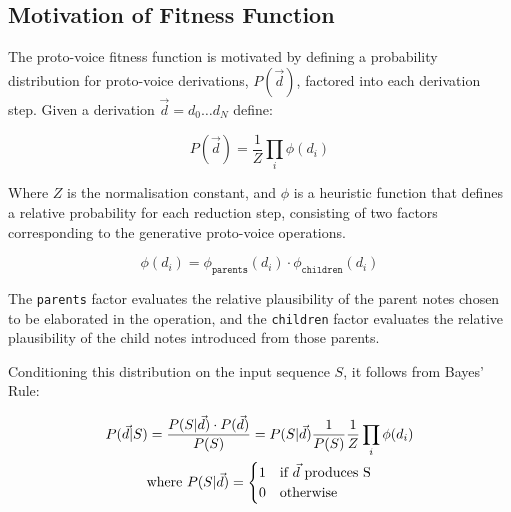 \documentclass[12pt,a4paper,twoside,openany]{report} \usepackage[pdfborder={0 0 0}]{hyperref}    %
\theoremstyle{definition} \newtheorem{definition}{Definition}[section]
\begin{document}
    \subsection{Motivation of Fitness Function}
    \label{sub:heuristicDesign}


    The proto-voice fitness function is motivated by defining a probability distribution for proto-voice
    derivations, $P(\vec{d})$, factored into each derivation step. 
    Given a derivation $\vec{d} = d_0 \dots d_N$ define: 

    \begin{equation}
      P(\vec{d}) = \frac{1}{Z} \prod_i \phi (d_i)
      \label{eq:}
    \end{equation}

    Where $Z$ is the normalisation constant, and $\phi$ is a heuristic function that defines a relative probability for
    each reduction step, consisting of two factors corresponding to the generative proto-voice operations. 

    \begin{equation}
      \phi(d_i) = \phi_{\texttt{parents}}(d_i) \cdot \phi_{\texttt{children}}(d_i)
      \label{eq:}
    \end{equation}

    The \texttt{parents} factor evaluates the relative plausibility of the parent notes chosen to be elaborated in the
    operation, and the \texttt{children} factor evaluates the relative plausibility of the child notes introduced from
    those parents. 
    
    Conditioning this distribution on the input sequence $S$, it follows from Bayes' Rule: 

    \begin{equation}
      \begin{gathered}
      P(\vec{d}|S) = \frac{P(S|\vec{d})\cdot P(\vec{d})}{P(S)} = P(S|\vec{d})\frac{1}{P(S)} \frac{1}{Z} \prod_i \phi(d_i) \\
      \text{where } P(S|\vec{d}) = 
        \begin{cases} 
          1 & \text{if } \vec{d} \text{ produces } $S$ \\
          0 & \text{otherwise}
        \end{cases}
      \end{gathered}
      \label{eq:}
    \end{equation}
    
\end{document}
